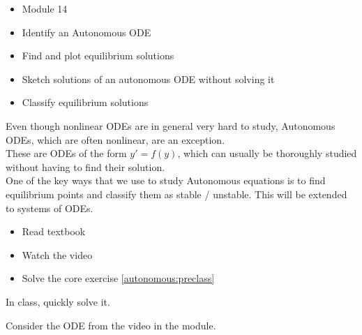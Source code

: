\begin{lesson}

	\begin{itemize}
		\item Module 14
	\end{itemize}

	\begin{itemize}
		\item Identify an Autonomous ODE
		\item Find and plot equilibrium solutions
		\item Sketch solutions of an autonomous ODE without solving it
		\item Classify equilibrium solutions
	\end{itemize}
	

Even though nonlinear ODEs are in general very hard to study, Autonomous ODEs, which are often nonlinear, are an exception. \\

These are ODEs of the form $y'=f(y)$, which can usually be thoroughly studied without having to find their solution. \\

One of the key ways that we use to study Autonomous equations is to find equilibrium points and classify them as stable / unstable.
This will be extended to systems of ODEs.


\begin{itemize}
	\item Read textbook
	\item Watch the video
	\item Solve the core exercise \ref{autonomous:preclass}
\end{itemize}


\end{lesson}


\begin{annotation}
\begin{goals}
	In class, quickly solve it.
\end{goals}	
\end{annotation}
\question \label{autonomous:preclass}
	Consider the ODE from the video in the module.

